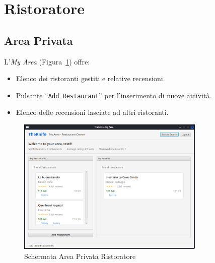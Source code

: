 \section{Ristoratore}
\label{cap:amministrazione}
\subsection{Area Privata}
L'\emph{My Area} (Figura~\ref{fig:myarea-owner}) offre:
\begin{itemize}
    \item Elenco dei ristoranti gestiti e relative recensioni.
    \item Pulsante “\texttt{Add Restaurant}” per l'inserimento di nuove attività.
    \item Elenco delle recensioni lasciate ad altri ristoranti.
\end{itemize}

\begin{figure}[H]
    \centering
    \includegraphics[width=0.8\textwidth]{images/myarea-owner.png}
    \caption{Schermata Area Privata Ristoratore}
    \label{fig:myarea-owner}
\end{figure}

